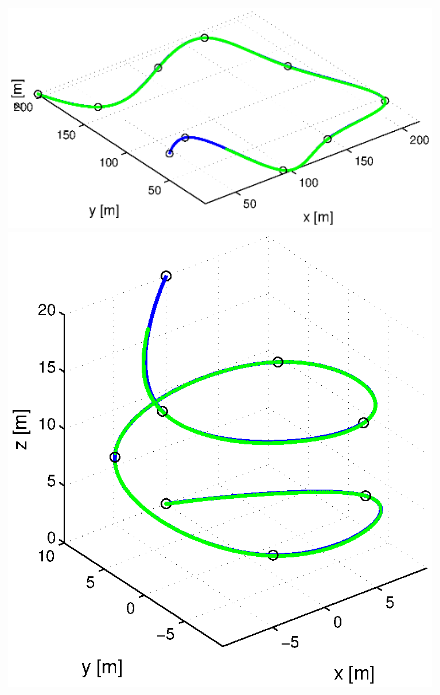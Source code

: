 \begin{figure}[H]
\begin{minipage}[t]{0.32\textwidth}
  \end{minipage}
  \vspace{5pt}
  \begin{minipage}[t]{0.32\textwidth}
    \includegraphics[width = \textwidth]{trackings_wc/figure_3D_road_SplineDegree3_crossTrack_Disturbance_0}
  \end{minipage}
  \hfill
  \begin{minipage}[t]{0.32\textwidth}
    \includegraphics[width = \textwidth]{trackings_wc/figure_3D_helix_SplineDegree3_crossTrack_Disturbance_0}
  \end{minipage}

\end{figure}
